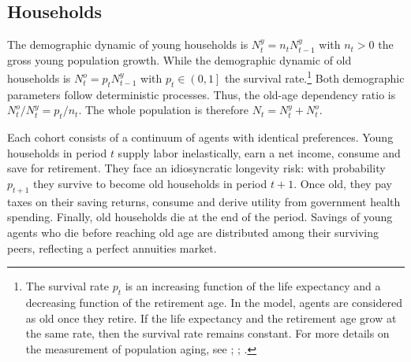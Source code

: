 \documentclass[
]{article}
\begin{document}
\hypertarget{households}{%
\subsection{Households}\label{households}}

The demographic dynamic of young households is \(N^y_t = n_t N^y_{t-1}\) with \(n_t > 0\) the gross young population growth. While the demographic dynamic of old households is \(N^o_t = p_t N^y_{t-1}\) with \(p_t \in \left(0,1\right]\) the survival rate.\footnote{The survival rate \(p_t\) is an increasing function of the life expectancy and a decreasing function of the retirement age. In the model, agents are considered as old once they retire. If the life expectancy and the retirement age grow at the same rate, then the survival rate remains constant. For more details on the measurement of population aging, see \citet{Sanderson2007}; \citet{Sanderson2013}; \citet{DAlbis2013}.} Both demographic parameters follow deterministic processes. Thus, the old-age dependency ratio is \(N^o_t/N^y_t = p_t/n_t\). The whole population is therefore \(N_t = N^y_t + N^o_t\).

Each cohort consists of a continuum of agents with identical preferences. Young households in period \(t\) supply labor inelastically, earn a net income, consume and save for retirement. They face an idiosyncratic longevity risk: with probability \(p_{t+1}\) they survive to become old households in period \(t+1\). Once old, they pay taxes on their saving returns, consume and derive utility from government health spending. Finally, old households die at the end of the period. Savings of young agents who die before reaching old age are distributed among their surviving peers, reflecting a perfect annuities market.
\end{document}
